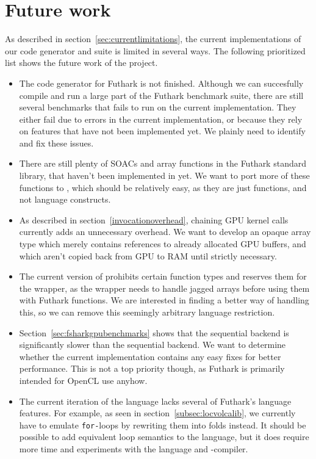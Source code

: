 \section*{Future work}
As described in section~\ref{sec:currentlimitations}, the current
implementations of our code generator and \fshark{} suite is limited in several
ways. The following prioritized list shows the future work of the \fshark{}
project.
\begin{itemize}
\item The \csharp{} code generator for Futhark is not finished. Although we can
  succesfully compile and run a large part of the Futhark benchmark suite,
  there are still several benchmarks that fails to run on the current implementation.
  They either fail due to errors in the current implementation, or because they rely on features that
  have not been implemented yet.
  We plainly need to identify and fix these issues.

\item There are still plenty of SOACs and array functions in the Futhark
  standard library, that haven't been implemented in \fshark{} yet.
  We want to port more of these functions to \fshark{}, which should be
  relatively easy, as they are just functions, and not language constructs.

\item As described in section~\ref{invocationoverhead}, chaining GPU kernel
  calls currently adds an unnecessary overhead. We want to develop an opaque
  array type which merely contains references to already allocated GPU buffers,
  and which aren't copied back from GPU to RAM until strictly necessary.

\item The current version of \fshark{} prohibits certain function types and
  reserves them for the \fshark{} wrapper, as the wrapper needs to handle jagged
  arrays before using them with \csharp{} Futhark functions.
  We are interested in finding a better way of handling this, so we can remove
  this seemingly arbitrary language restriction.
  
\item Section~\ref{sec:fsharkgpubenchmarks} shows that the sequential \csharp{}
  backend is significantly slower than the sequential \clang{} backend. We want to
  determine whether the current implementation contains any easy fixes for
  better performance. This is not a top priority though, as Futhark is primarily
  intended for OpenCL use anyhow.

\item The current iteration of the \fshark{} language lacks several of Futhark's
  language features.
  For example, as seen in section~\ref{subsec:locvolcalib}, we currently have to emulate \texttt{for-}loops by rewriting them into folds instead.
  It should be possible to add equivalent loop semantics to the \fshark{} language,
  but it does require more time and experiments with the \fsharp{} language and -compiler.


\end{itemize}
